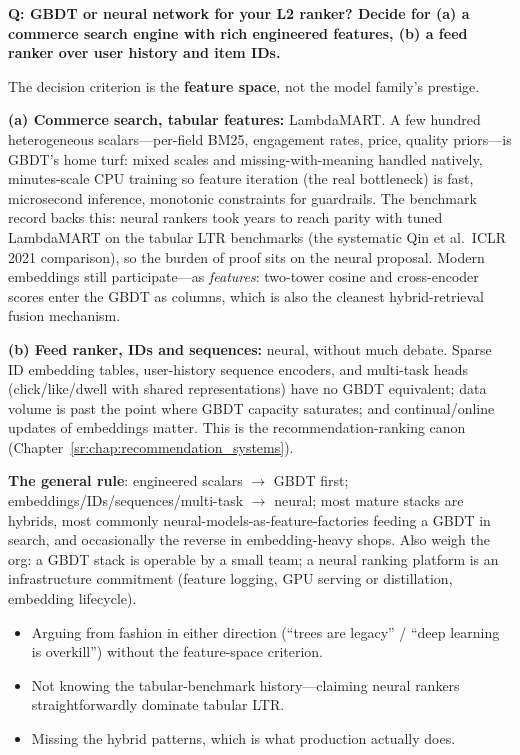 \begin{interviewq}
\textbf{Q: GBDT or neural network for your L2 ranker? Decide for (a) a commerce search engine with rich engineered features, (b) a feed ranker over user history and item IDs.}

 \quad {} \quad \badgefreq{\freqhigh}

\stronganswer

The decision criterion is the \textbf{feature space}, not the model family's prestige.

\textbf{(a) Commerce search, tabular features:} LambdaMART. A few hundred heterogeneous scalars---per-field BM25, engagement rates, price, quality priors---is GBDT's home turf: mixed scales and missing-with-meaning handled natively, minutes-scale CPU training so feature iteration (the real bottleneck) is fast, microsecond inference, monotonic constraints for guardrails. The benchmark record backs this: neural rankers took years to reach parity with tuned LambdaMART on the tabular LTR benchmarks (the systematic Qin et al.\ ICLR 2021 comparison), so the burden of proof sits on the neural proposal. Modern embeddings still participate---as \textit{features}: two-tower cosine and cross-encoder scores enter the GBDT as columns, which is also the cleanest hybrid-retrieval fusion mechanism.

\textbf{(b) Feed ranker, IDs and sequences:} neural, without much debate. Sparse ID embedding tables, user-history sequence encoders, and multi-task heads (click/like/dwell with shared representations) have no GBDT equivalent; data volume is past the point where GBDT capacity saturates; and continual/online updates of embeddings matter. This is the recommendation-ranking canon (Chapter~\ref{sr:chap:recommendation_systems}).

\textbf{The general rule}: engineered scalars $\rightarrow$ GBDT first; embeddings/IDs/sequences/multi-task $\rightarrow$ neural; most mature stacks are hybrids, most commonly neural-models-as-feature-factories feeding a GBDT in search, and occasionally the reverse in embedding-heavy shops. Also weigh the org: a GBDT stack is operable by a small team; a neural ranking platform is an infrastructure commitment (feature logging, GPU serving or distillation, embedding lifecycle).

\redflags
\begin{itemize}
    \item Arguing from fashion in either direction (``trees are legacy'' / ``deep learning is overkill'') without the feature-space criterion.
    \item Not knowing the tabular-benchmark history---claiming neural rankers straightforwardly dominate tabular LTR.
    \item Missing the hybrid patterns, which is what production actually does.
\end{itemize}


\end{interviewq}
